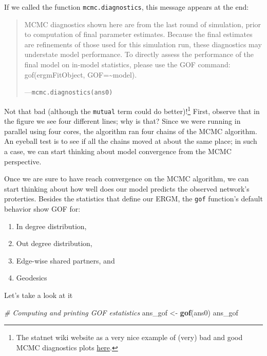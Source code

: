 \documentclass[]{book}
\newenvironment{Shaded}{\begin{snugshade}}{\end{snugshade}}
\newcommand{\CommentTok}[1]{\textcolor[rgb]{0.56,0.35,0.01}{\textit{#1}}}
\newcommand{\KeywordTok}[1]{\textcolor[rgb]{0.13,0.29,0.53}{\textbf{#1}}}
\newcommand{\NormalTok}[1]{#1}
\newcommand{\StringTok}[1]{\textcolor[rgb]{0.31,0.60,0.02}{#1}}
\providecommand{\tightlist}{%
  \setlength{\itemsep}{0pt}\setlength{\parskip}{0pt}}
\begin{document}
If we called the function \texttt{mcmc.diagnostics}, this message appears at the end:

\begin{quote}
MCMC diagnostics shown here are from the last round of simulation, prior to computation of final parameter estimates. Because the final estimates are refinements of those used for this simulation run, these diagnostics may understate model performance. To directly assess the performance of the final model on in-model statistics, please use the GOF command: gof(ergmFitObject, GOF=\textasciitilde{}model).

---\texttt{mcmc.diagnostics(ans0)}
\end{quote}

Not that bad (although the \texttt{mutual} term could do better)!\footnote{The statnet wiki website as a very nice example of (very) bad and good MCMC diagnostics plots \href{https://statnet.org/trac/raw-attachment/wiki/Resources/ergm.fit.diagnostics.pdf}{here}.} First, observe that in the figure we see four different lines; why is that? Since we were running in parallel using four cores, the algorithm ran four chains of the MCMC algorithm. An eyeball test is to see if all the chains moved at about the same place; in such a case, we can start thinking about model convergence from the MCMC perspective.

Once we are sure to have reach convergence on the MCMC algorithm, we can start thinking about how well does our model predicts the observed network's proterties. Besides the statistics that define our ERGM, the \texttt{gof} function's default behavior show GOF for:

\begin{enumerate}
\def\labelenumi{\alph{enumi}.}
\tightlist
\item
  In degree distribution,
\item
  Out degree distribution,
\item
  Edge-wise shared partners, and
\item
  Geodesics
\end{enumerate}

Let's take a look at it

\begin{Shaded}
\begin{Highlighting}[]
\CommentTok{# Computing and printing GOF estatistics}
\NormalTok{ans_gof <-}\StringTok{ }\KeywordTok{gof}\NormalTok{(ans0)}
\NormalTok{ans_gof}
\end{Highlighting}
\end{Shaded}
\end{document}
